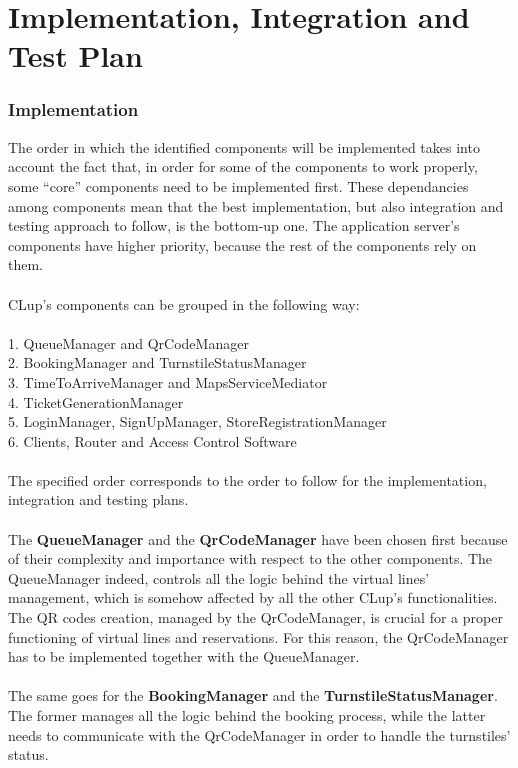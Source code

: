 \documentclass{article}
\begin{document}
\section{Implementation, Integration and Test Plan}
\subsubsection{Implementation}
The order in which the identified components will be implemented takes into account the fact that, in order for some of the components to work properly, some “core” components need to be implemented first. These dependancies among components mean that the best implementation, but also integration and testing approach to follow, is the bottom-up one. 
The application server’s components have higher priority, because the rest of the components rely on them.\\
\smallskip\\
CLup’s components can be grouped in the following way:\\
\smallskip\\
1. QueueManager and QrCodeManager\\
2. BookingManager and TurnstileStatusManager \\
3. TimeToArriveManager and MapsServiceMediator\\
4. TicketGenerationManager\\
5. LoginManager, SignUpManager, StoreRegistrationManager\\
6. Clients, Router and Access Control Software\\
\smallskip\\
The specified order corresponds to the order to follow for the implementation, integration and testing plans.\\
\smallskip\\
The \textbf{QueueManager} and the \textbf{QrCodeManager} have been chosen first because of their complexity and importance with respect to the other components. The QueueManager indeed, controls all the logic behind the virtual lines’ management, which is somehow affected by all the other CLup’s functionalities. The QR codes creation, managed by the QrCodeManager, is crucial for a proper functioning of virtual lines and reservations. For this reason, the QrCodeManager has to be implemented together with the QueueManager.\\
\smallskip\\
The same goes for the \textbf{BookingManager} and the \textbf{TurnstileStatusManager}. The former manages all the logic behind the booking process, while the latter needs to communicate with the QrCodeManager in order to handle the turnstiles’ status.\\
\end{document}
